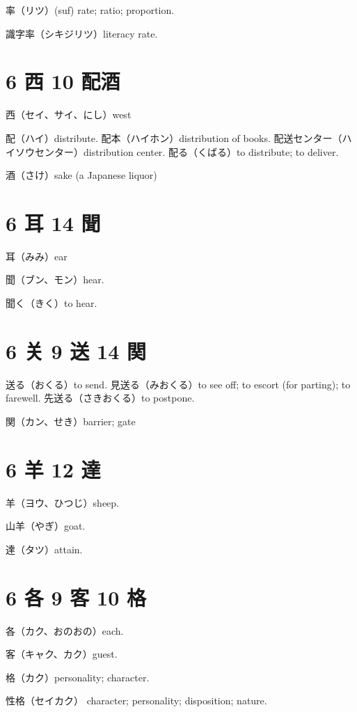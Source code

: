 率（リツ）(suf) rate; ratio; proportion.

識字率（シキジリツ）literacy rate.

\section{6 西 10 配酒}

西（セイ、サイ、にし）west

配（ハイ）distribute.
配本（ハイホン）distribution of books.
配送センター（ハイソウセンター）distribution center.
配る（くばる）to distribute; to deliver.

酒（さけ）sake (a Japanese liquor)

\section{6 耳 14 聞}

耳（みみ）ear

聞（ブン、モン）hear.

聞く（きく）to hear.

\section{6 关 9 送 14 関}

送る（おくる）to send.
見送る（みおくる）to see off; to escort (for parting); to farewell.
先送る（さきおくる）to postpone.

関（カン、せき）barrier; gate

\section{6 羊 12 達}

羊（ヨウ、ひつじ）sheep.

山羊（やぎ）goat.

達（タツ）attain.

\section{6 各 9 客 10 格}

各（カク、おのおの）each.

客（キャク、カク）guest.

格（カク）personality; character.

性格（セイカク）
character; personality; disposition; nature.
